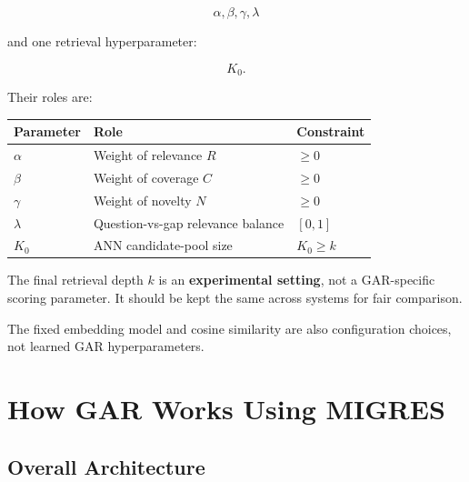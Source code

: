 \documentclass[11pt,a4paper]{article}
\begin{document}
\[
\boxed{
\alpha,\beta,\gamma,\lambda
}
\]

and one retrieval hyperparameter:

\[
\boxed{K_0}.
\]

Their roles are:

\begin{center}
\begin{tabular}{lll}
\toprule
\textbf{Parameter} & \textbf{Role} & \textbf{Constraint}\\
\midrule
$\alpha$ & Weight of relevance $R$ & $\geq0$\\
$\beta$ & Weight of coverage $C$ & $\geq0$\\
$\gamma$ & Weight of novelty $N$ & $\geq0$\\
$\lambda$ & Question-vs-gap relevance balance & $[0,1]$\\
$K_0$ & ANN candidate-pool size & $K_0\geq k$\\
\bottomrule
\end{tabular}
\end{center}

The final retrieval depth $k$ is an \textbf{experimental setting}, not a GAR-specific scoring parameter. It should be kept the same across systems for fair comparison.

The fixed embedding model and cosine similarity are also configuration choices, not learned GAR hyperparameters.

\section{How GAR Works Using MIGRES}

\subsection{Overall Architecture}
\end{document}
